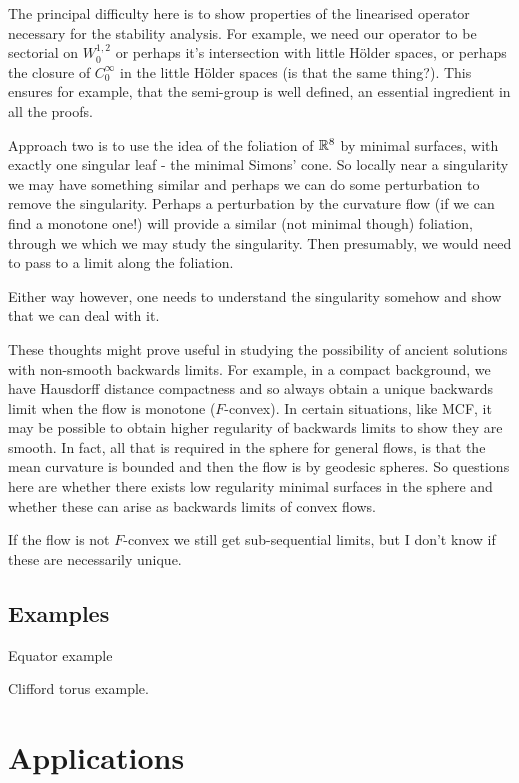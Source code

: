 \documentclass{amsart}
\begin{document}
The principal difficulty here is to show properties of the linearised operator necessary for the stability analysis. For example, we need our operator to be sectorial on \(W^{1,2}_0\) or perhaps it's intersection with little H\"older spaces, or perhaps the closure of \(C^{\infty}_0\) in the little H\"older spaces (is that the same thing?). This ensures for example, that the semi-group is well defined, an essential ingredient in all the proofs.

Approach two is to use the idea of the foliation of \(\mathbb{R}^8\) by minimal surfaces, with exactly one singular leaf - the minimal Simons' cone. So locally near a singularity we may have something similar and perhaps we can do some perturbation to remove the singularity. Perhaps a perturbation by the curvature flow (if we can find a monotone one!) will provide a similar (not minimal though) foliation, through we which we may study the singularity. Then presumably, we would need to pass to a limit along the foliation.

Either way however, one needs to understand the singularity somehow and show that we can deal with it.

These thoughts might prove useful in studying the possibility of ancient solutions with non-smooth backwards limits. For example, in a compact background, we have Hausdorff distance compactness and so always obtain a unique backwards limit when the flow is monotone (\(F\)-convex). In certain situations, like MCF, it may be possible to obtain higher regularity of backwards limits to show they are smooth. In fact, all that is required in the sphere for general flows, is that the mean curvature is bounded and then the flow is by geodesic spheres. So questions here are whether there exists low regularity minimal surfaces in the sphere and whether these can arise as backwards limits of convex flows.

If the flow is not \(F\)-convex we still get sub-sequential limits, but I don't know if these are necessarily unique.

\subsection{Examples}
\label{subsec:minimal_examples}

Equator example

Clifford torus example.

\section{Applications}
\label{sec:applications}
\end{document}
